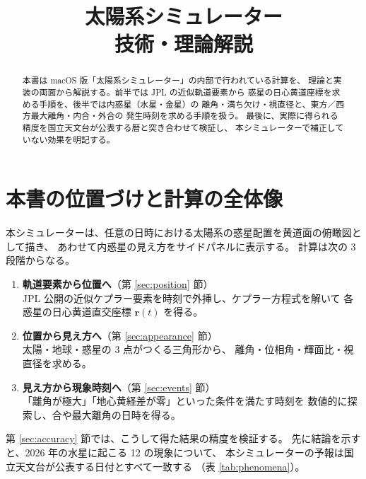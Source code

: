 \documentclass[a4paper,11pt]{ltjsarticle}
\title{太陽系シミュレーター\\[2mm]\large 技術・理論解説}
\author{}
\date{}
\newcommand{\vek}[1]{\boldsymbol{#1}}
\begin{document}
\maketitle

\begin{abstract}
\noindent
本書は macOS 版「太陽系シミュレーター」の内部で行われている計算を、
理論と実装の両面から解説する。前半では JPL の近似軌道要素から
惑星の日心黄道座標を求める手順を、後半では内惑星（水星・金星）の
離角・満ち欠け・視直径と、東方／西方最大離角・内合・外合の
発生時刻を求める手順を扱う。
最後に、実際に得られる精度を国立天文台が公表する暦と突き合わせて検証し、
本シミュレーターで補正していない効果を明記する。
\end{abstract}

\tableofcontents

\section{本書の位置づけと計算の全体像}

本シミュレーターは、任意の日時における太陽系の惑星配置を黄道面の俯瞰図として描き、
あわせて内惑星の見え方をサイドパネルに表示する。
計算は次の 3 段階からなる。

\begin{enumerate}
  \item \textbf{軌道要素から位置へ}（第 \ref{sec:position} 節）\\
        JPL 公開の近似ケプラー要素を時刻で外挿し、ケプラー方程式を解いて
        各惑星の日心黄道直交座標 $\vek{r}(t)$ を得る。
  \item \textbf{位置から見え方へ}（第 \ref{sec:appearance} 節）\\
        太陽・地球・惑星の 3 点がつくる三角形から、
        離角・位相角・輝面比・視直径を求める。
  \item \textbf{見え方から現象時刻へ}（第 \ref{sec:events} 節）\\
        「離角が極大」「地心黄経差が零」といった条件を満たす時刻を
        数値的に探索し、合や最大離角の日時を得る。
\end{enumerate}

第 \ref{sec:accuracy} 節では、こうして得た結果の精度を検証する。
先に結論を示すと、2026 年の水星に起こる 12 の現象について、
本シミュレーターの予報は国立天文台が公表する日付とすべて一致する
（表 \ref{tab:phenomena}）。

\end{document}
